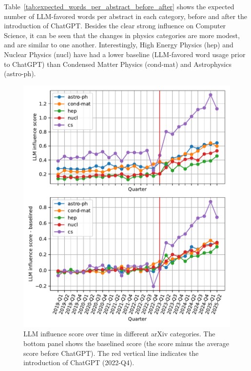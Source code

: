 \documentclass[twocolumn]{aastex701}
\begin{document}
Table~\ref{tab:expected_words_per_abstract_before_after} shows the expected number of LLM-favored words per abstract in each category, before and after the introduction of ChatGPT.
Besides the clear strong influence on Computer Science, it can be seen that the changes in physics categories are more modest, and are similar to one another.
Interestingly, High Energy Physics (hep) and Nuclear Physics (nucl) have had a lower baseline (LLM-favored word usage prior to ChatGPT) than Condensed Matter Physics (cond-mat) and Astrophysics (astro-ph).


\begin{figure}[h]
\centering
\includegraphics[width=\columnwidth]{scripts/figs/major_cats_score_vs_time.pdf}
\caption{
LLM influence score over time in different arXiv categories.
The bottom panel shows the baselined score (the score minus the average score before ChatGPT).
The red vertical line indicates the introduction of ChatGPT (2022-Q4).
}
\label{fig:category_comparison}
\end{figure}
\end{document}
